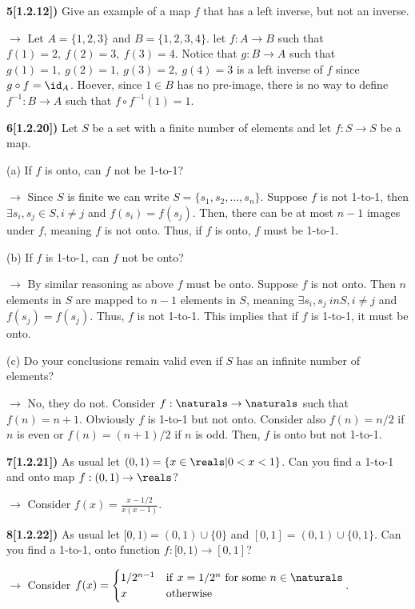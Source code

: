 \documentclass[12pt,a4paper]{article}
\newcommand{\prob}[2]{\textbf{#1)} #2}
\begin{document}
\prob{5[1.2.12]}{Give an example of a map $f$ that has a left inverse, but not an inverse.}

$\rightarrow$ Let $A = \{1,2,3\}$ and $B = \{1,2,3,4\}$. let $f: A \rightarrow B$ such that $f(1) = 2,~f(2)=3,~f(3)=4$. Notice that $g: B \rightarrow A$ such that $g(1)=1,~g(2)=1,~g(3)=2,~g(4)=3$ is a left inverse of $f$ since $g \circ f = \id_{A}$. Hoever, since $1 \in B$ has no pre-image, there is no way to define $f^{-1}: B \rightarrow A$ such that $f \circ f^{-1}(1) = 1$.

\prob{6[1.2.20]}{Let $S$ be a set with a finite number of elements and let $f: S \rightarrow S$ be a map.}

(a) If $f$ is onto, can $f$ not be 1-to-1?

$\rightarrow$ Since $S$ is finite we can write $S = \{s_1,s_2,\hdots,s_n\}$. Suppose $f$ is not 1-to-1, then $\exists s_i, s_j \in S, i \not= j$ and $f(s_i) = f(s_j)$. Then, there can be at most $n-1$ images under $f$, meaning $f$ is not onto. Thus, if $f$ is onto, $f$ must be 1-to-1.

(b) If $f$ is 1-to-1, can $f$ not be onto?

$\rightarrow$ By similar reasoning as above $f$ must be onto. Suppose $f$ is not onto. Then $n$ elements in $S$ are mapped to $n-1$ elements in $S$, meaning $\exists s_i,s_j \ in S, i \not= j$ and $f(s_j) = f(s_j)$. Thus, $f$ is not 1-to-1. This implies that if $f$ is 1-to-1, it must be onto.

(c) Do your conclusions remain valid even if $S$ has an infinite number of elements?

$\rightarrow$ No, they do not. Consider $f: \naturals \rightarrow \naturals$ such that $f(n) = n+1$. Obviously $f$ is 1-to-1 but not onto. Consider also $f(n) = n/2$ if $n$ is even or $f(n) = (n+1)/2$ if $n$ is odd. Then, $f$ is onto but not 1-to-1.

\prob{7[1.2.21]}{As usual let $(0,1) = \{x \in \reals | 0 < x < 1\}$. Can you find a 1-to-1 and onto map $f: (0,1) \rightarrow \reals$?}

$\rightarrow$ Consider $f(x) = \frac{x-1/2}{x(x-1)}$.

\prob{8[1.2.22]}{As usual let $[0,1) = (0,1)\cup\{0\}$ and $[0,1] = (0,1)\cup\{0,1\}$. Can you find a 1-to-1, onto function $f: [0,1) \rightarrow [0,1]$?}

$\rightarrow$ Consider $f(x) = \begin{cases} 1/2^{n-1} & {\rm if~} x = 1/2^{n} {\rm ~for~some~} n \in \naturals \\ x & {\rm otherwise}\end{cases}$.
\end{document}
